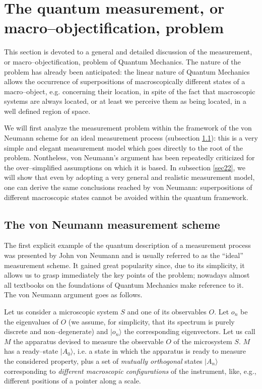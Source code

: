 \documentclass[10pt,a4paper]{article}
\begin{document}
\section{The quantum measurement, or
macro--objecti\-fi\-ca\-ti\-on, problem} \label{sec2}

This section is devoted to a general and detailed discussion of
the measurement, or macro--objectification, problem of Quantum
Mechanics. The nature of the problem has already been anticipated:
the linear nature of Quantum Mechanics allows the occurrence of
superpositions of macroscopically different states of a
macro--object, e.g. concerning their location, in spite of the
fact that macroscopic systems are always located, or at least we
perceive them as being located, in a well defined region of space.

We will first analyze the measurement problem within the framework
of the von Neumann scheme for an ideal measurement process
(subsection \ref{sec21}): this is a very simple and elegant
measurement model which goes directly to the root of the problem.
Nontheless, von Neumann's argument has been repeatedly criticized
for the over--simplified assumptions on which it is based. In
subsection \ref{sec22}, we will show that even by adopting a very
general and realistic measurement model, one can derive the same
conclusions reached by von Neumann: superpositions of different
macroscopic states cannot be avoided within the quantum framework.




\subsection{The von Neumann measurement scheme} \label{sec21}

The first explicit example of the quantum description of a
measurement process was presented by John von Neumann  \cite{vn}
and is usually referred to as the ``ideal'' measurement scheme. It
gained great popularity since, due to its simplicity, it allows us
to grasp immediately the key points of the problem; nowadays
almost all textbooks on the foundations of Quantum Mechanics make
reference to it. The von Neumann argument goes as follows.

Let us consider a microscopic system $S$ and one of its
observables $O$. Let $o_{n}$ be the eigenvalues of $O$ (we assume,
for simplicity, that its spectrum is purely discrete and
non--degenerate) and $|o_{n}\rangle$ the corresponding
eigenvectors. Let us call $M$ the apparatus devised to measure the
observable $O$ of the microsystem $S$.  $M$ has a ready--state
$|A_{0}\rangle$, i.e. a state in which the apparatus is ready to
measure the considered property, plus a set of {\it mutually
orthogonal} states  $|A_{n}\rangle$ corresponding to {\it
different macroscopic configurations} of the instrument, like,
e.g., different positions of a pointer along a scale.
\end{document}
